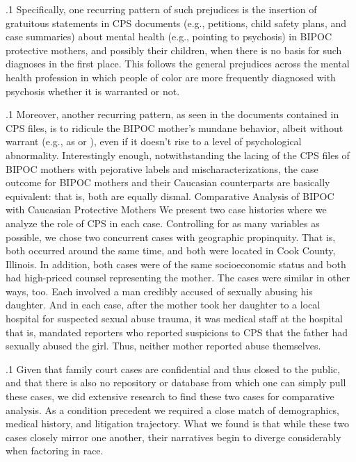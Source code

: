 \documentclass[11pt, twoside]{article}
\begin{document}
{\p.1{%
Specifically, one recurring pattern of such prejudices is the insertion of gratuitous statements in CPS documents (e.g., petitions, child
safety plans, and case summaries) about mental health 
(e.g., pointing to psychosis) in BIPOC protective mothers, and possibly
their children, when there is no basis for such diagnoses in the first place.
This follows the general prejudices across the mental health profession
in which people of color are more frequently diagnosed with psychosis
whether it is warranted or not.
}%

\p.1{%
Moreover, another recurring pattern, as seen in the documents contained in CPS files, is to ridicule the BIPOC mother's mundane behavior,
albeit without warrant (e.g., as   or ),
even if it doesn't rise to a level of psychological abnormality. Interestingly enough, notwithstanding the lacing of the CPS files of BIPOC
mothers with pejorative labels and mischaracterizations, the case outcome for BIPOC mothers and their Caucasian counterparts are basically
equivalent: that is, both are equally dismal.
Comparative Analysis of BIPOC with Caucasian Protective Mothers
We present two case histories where we analyze the role of CPS in each
case. Controlling for as many variables as possible, we chose two concurrent cases with geographic propinquity. That is, both occurred around
the same time, and both were located in Cook County, Illinois. In addition, both cases were of the same socioeconomic status and both had
high-priced counsel representing the mother. The cases were similar in
other ways, too. Each involved a man credibly accused of sexually abusing his daughter. And in each case, after the mother took her daughter
to a local hospital for suspected sexual abuse trauma, it was medical staff
at the hospital \mdash{} that is, mandated reporters \mdash{} who reported suspicions
to CPS that the father had sexually abused the girl. Thus, neither mother
reported abuse themselves.
}%

\p.1{%
Given that family court cases are confidential and thus closed to the
public, and that there is also no repository or database from which one
can simply pull these cases, we did extensive research to find these two
cases for comparative analysis. As a condition precedent we required
a close match of demographics, medical history, and litigation trajectory. What we found is that while these two cases closely mirror one
another, their narratives begin to diverge considerably when factoring
in race.
}%

}
\end{document}
